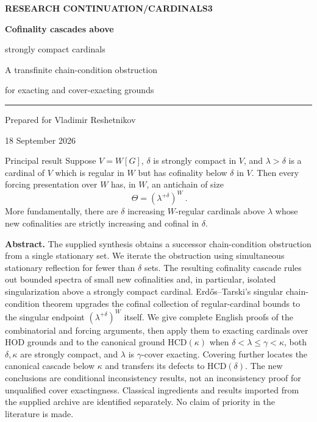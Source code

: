 \documentclass[11pt,letterpaper]{article}
\theoremstyle{definition}
\numberwithin{equation}{section}
\newcommand{\HCD}{\mathrm{HCD}}
\begin{document}
\begin{titlepage}
\thispagestyle{empty}
\vspace*{0.30in}
{\sffamily\small\bfseries\color{Olive}RESEARCH CONTINUATION\quad /\quad CARDINALS3}\par
\vspace{0.24in}
{\fontsize{28}{31}\selectfont\bfseries\color{Forest}Cofinality cascades above\par strongly compact cardinals}\par
\vspace{0.16in}
{\fontsize{14}{18}\selectfont\color{Muted}A transfinite chain-condition obstruction\par for exacting and cover-exacting grounds}\par
\vspace{0.24in}
{\color{Sage}\rule{\textwidth}{0.7pt}}\par
\vspace{0.11in}
Prepared for Vladimir Reshetnikov\par
18 September 2026\par
\vspace{0.22in}
\begin{assessment}{Principal result}
Suppose $V=W[G]$, $\delta$ is strongly compact in $V$, and $\lambda>\delta$ is a cardinal of $V$ which is regular in $W$ but has cofinality below $\delta$ in $V$. Then every forcing presentation over $W$ has, in $W$, an antichain of size
\[
\boxed{\ \Theta=(\lambda^{+\delta})^W\ }.
\]
More fundamentally, there are $\delta$ increasing $W$-regular cardinals above $\lambda$ whose new cofinalities are strictly increasing and cofinal in $\delta$.
\end{assessment}
\vspace{0.08in}
\textbf{Abstract.}
The supplied synthesis obtains a successor chain-condition obstruction from a single stationary set. We iterate the obstruction using simultaneous stationary reflection for fewer than $\delta$ sets. The resulting cofinality cascade rules out bounded spectra of small new cofinalities and, in particular, isolated singularization above a strongly compact cardinal. Erd\H{o}s--Tarski's singular chain-condition theorem upgrades the cofinal collection of regular-cardinal bounds to the singular endpoint $(\lambda^{+\delta})^W$ itself. We give complete English proofs of the combinatorial and forcing arguments, then apply them to exacting cardinals over HOD grounds and to the canonical ground $\HCD(\kappa)$ when
$\delta<\lambda\le\gamma<\kappa$, both $\delta,\kappa$ are strongly compact, and $\lambda$ is $\gamma$-cover exacting. Covering further locates the canonical cascade below $\kappa$ and transfers its defects to $\HCD(\delta)$.
\vfill
{\small\color{Muted}The new conclusions are conditional inconsistency results, not an inconsistency proof for unqualified cover exactingness. Classical ingredients and results imported from the supplied archive are identified separately. No claim of priority in the literature is made.}
\end{titlepage}
\end{document}
